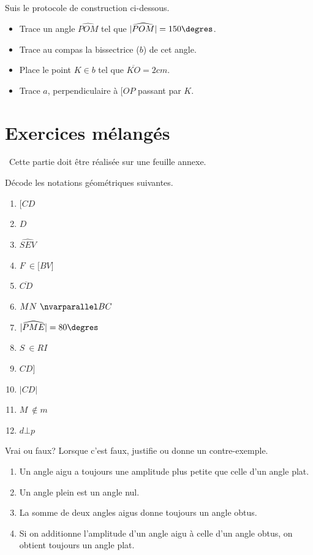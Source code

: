 \documentclass[../../syllabus_1.tex]{subfiles}
\begin{document}
\newpage
\begin{exercise}
    Suis le protocole de construction ci-dessous.
    \begin{itemize}
        \item  Trace un angle \(\widehat{POM}\) tel que \(|\widehat{POM}|=150\degres\). \\
        \item Trace au compas la bissectrice (\(b\)) de cet angle. \\
        \item Place le point \(K \in b\) tel que \(\overline{KO}=2cm\). \\
        \item Trace \(a\), perpendiculaire à \([OP\) passant par \(K\).
    \end{itemize}

\end{exercise}

\newpage
\section{Exercices mélangés}
~Cette partie doit être réalisée sur une feuille annexe.
\setcounter{exercise}{0}

\begin{exercise}
    Décode les notations géométriques suivantes.
    \begin{enumerate}[cols=4]
        \item \(\lbrack CD\)
        \item \(D\)
        \item \(\widehat{SEV}\)
        \item \(F\  \in \lbrack BV\rbrack\)
        \item \(\overline{CD}\)
        \item \(MN\  \nvarparallel BC\)
        \item \(|\widehat{PME}|=80\degres\)
        \item \(S\  \in RI\)
        \item \(CD\rbrack\)
        \item \(|CD|\)
        \item \(M\  \notin m\)
        \item \(d \bot p\)
    \end{enumerate}
\end{exercise}

\begin{exercise}
    Vrai ou faux? Lorsque c'est faux, justifie ou donne un contre-exemple.
    \begin{enumerate}
        \item Un angle aigu a toujours une amplitude plus petite que celle d'un angle plat.
        \item Un angle plein est un angle nul.
        \item La somme de deux angles aigus donne toujours un angle obtus.
        \item Si on additionne l'amplitude d'un angle aigu à celle d'un angle obtus, on obtient toujours un angle plat.
    \end{enumerate}
\end{exercise}
\end{document}
